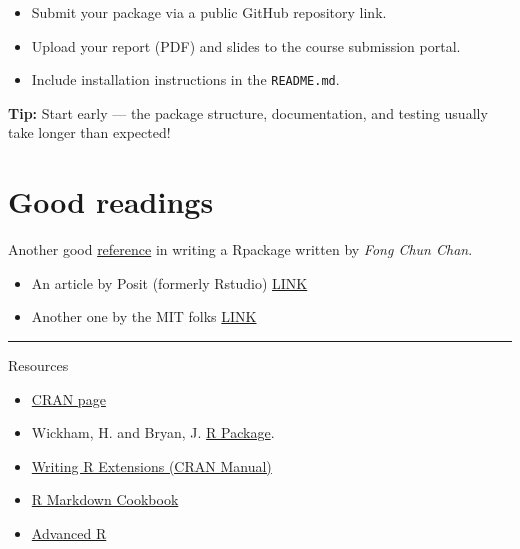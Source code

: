 \documentclass[
  letterpaper,
  DIV=11,
  numbers=noendperiod]{scrreprt}
\providecommand{\tightlist}{%
  \setlength{\itemsep}{0pt}\setlength{\parskip}{0pt}}
\begin{document}
\begin{itemize}
\tightlist
\item
  Submit your package via a public GitHub repository link.
\item
  Upload your report (PDF) and slides to the course submission portal.
\item
  Include installation instructions in the \texttt{README.md}.
\end{itemize}

\begin{tcolorbox}[enhanced jigsaw, leftrule=.75mm, bottomrule=.15mm, coltitle=black, opacitybacktitle=0.6, left=2mm, bottomtitle=1mm, colbacktitle=quarto-callout-tip-color!10!white, opacityback=0, colframe=quarto-callout-tip-color-frame, arc=.35mm, title=\textcolor{quarto-callout-tip-color}{\faLightbulb}\hspace{0.5em}{Tip}, colback=white, breakable, titlerule=0mm, toprule=.15mm, toptitle=1mm, rightrule=.15mm]

\textbf{Tip:} Start early --- the package structure, documentation, and
testing usually take longer than expected!

\end{tcolorbox}

\section{Good readings}\label{good-readings}

Another good
\href{\%5Bhttps://tinyheero.github.io/jekyll/update/2015/07/26/making-your-first-R-package.html\%5D}{reference}
in writing a Rpackage written by \emph{Fong Chun Chan}.

\begin{itemize}
\item
  An article by Posit (formerly Rstudio)
  \href{https://docs.posit.co/ide/user/ide/guide/pkg-devel/writing-packages.html}{LINK}
\item
  Another one by the MIT folks
  \href{https://web.mit.edu/insong/www/pdf/rpackage_instructions.pdf}{LINK}
\end{itemize}

\begin{center}\rule{0.5\linewidth}{0.5pt}\end{center}

Resources

\begin{itemize}
\item
  \href{https://cran.r-project.org/web/packages/distributions/index.html}{CRAN
  page}
\item
  Wickham, H. and Bryan, J. \href{https://r-pkgs.org/}{R Package}.
\item
  \href{https://cran.r-project.org/doc/manuals/r-release/R-exts.html}{Writing
  R Extensions (CRAN Manual)}
\item
  \href{https://bookdown.org/yihui/rmarkdown/}{R Markdown Cookbook}
\item
  \href{https://adv-r.hadley.nz/}{Advanced R}
\end{itemize}
\end{document}
